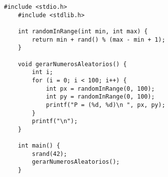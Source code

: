 \begin{lstlisting}[style=codigoC]
    #include <stdio.h>
    #include <stdlib.h>
    
    int randomInRange(int min, int max) {
        return min + rand() % (max - min + 1);
    }
    
    void gerarNumerosAleatorios() {
        int i;
        for (i = 0; i < 100; i++) {
            int px = randomInRange(0, 100);
            int py = randomInRange(0, 100);
            printf("P = (%d, %d)\n ", px, py);
        }
        printf("\n");
    }
    
    int main() {
        srand(42);
        gerarNumerosAleatorios();
    }
\end{lstlisting}
